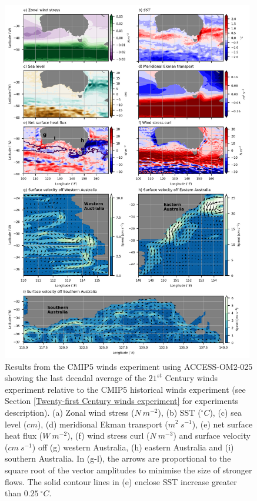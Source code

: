 \documentclass[draft,linenumbers]{agujournal2018}
\begin{document}
\begin{figure}[h]
\centering
\includegraphics[trim={0 0.25cm 0cm 0.1cm},clip, width=0.98\textwidth]{t09_fig1_.png}
\caption{Results from the CMIP5 winds experiment using ACCESS-OM2-025 showing the last decadal average of the $21^{st}$ Century winds experiment relative to the CMIP5 historical winds experiment (see Section \ref{Twenty-first Century winds experiment} for experiments description). (a) Zonal wind stress ($N\ m^{-2}$), (b) SST ($^{\circ}C$), (c) sea level ($cm$), (d) meridional Ekman transport ($m^2\ s^{-1}$), (e) net surface heat flux ($W\ m^{-2}$), (f) wind stress curl ($N\ m^{-3}$) and surface velocity ($cm\ s^{-1}$) off (g) western Australia, (h) eastern Australia and (i) southern Australia. In (g-l), the arrows are proportional to the square root of the vector amplitudes to minimise the size of stronger flows. The solid contour lines in (e) enclose SST increase greater than $0.25\ ^{\circ}C$.}\label{t09_fig1_}
\end{figure}
\end{document}
